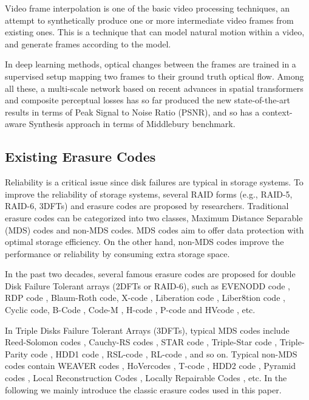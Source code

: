\documentclass[sigconf]{acmart}
\begin{document}
Video frame interpolation is one of the basic video processing techniques, an attempt to synthetically produce one or more intermediate video frames from existing ones. This is a technique that can model natural motion within a video, and generate frames according to the model.

In deep learning methods, optical changes between the frames are trained in a supervised setup mapping two frames to their ground truth optical flow. Among all these, a multi-scale network\cite{van2017frame} based on recent advances in spatial transformers and composite perceptual losses has so far produced the new state-of-the-art results in terms of Peak Signal to Noise Ratio (PSNR), and so has a context-aware Synthesis approach\cite{niklaus2018context} in terms of Middlebury benchmark.

\subsection{Existing Erasure Codes}\label{existEC}

Reliability is a critical issue since disk failures are typical in storage systems. To improve the reliability of storage systems, several RAID forms (e.g., RAID-5, RAID-6, 3DFTs) and erasure codes are proposed by researchers.  Traditional erasure codes can be categorized into two classes, Maximum Distance Separable (MDS) codes and non-MDS codes. MDS codes aim to offer data protection with optimal storage efficiency. On the other hand, non-MDS codes improve the performance or reliability by consuming extra storage space.

In the past two decades, several famous erasure codes are proposed for double Disk Failure Tolerant arrays (2DFTs or RAID-6), such as EVENODD code \cite{EVENODD}, RDP code \cite{RDP}, Blaum-Roth code\cite{BlaumRoth}, X-code \cite{XCode}, Liberation code \cite{Liberation}, Liber8tion code \cite{Liber8tion}, Cyclic \cite {Cyclic} code, B-Code \cite{BCode}, Code-M \cite{Code-M}, H-code \cite{hcode}, P-code \cite{PCode} and HVcode \cite{HVCode}, etc.

In Triple Disks Failure Tolerant Arrays (3DFTs), typical MDS codes include Reed-Solomon codes \cite{RS}, Cauchy-RS codes \cite{CRS}, STAR code \cite{STAR}, Triple-Star code \cite{TripleStar}, Triple-Parity code \cite{TPtech}, HDD1 code \cite{HDD}, RSL-code \cite{RSL}, RL-code \cite{RL}, and so on. Typical non-MDS codes contain WEAVER codes \cite{WEAVER}, HoVercodes \cite{HoVer}, T-code \cite{TCode}, HDD2 code \cite{HDD}, Pyramid codes \cite{Pyramid}, Local Reconstruction Codes \cite{LRC}, Locally Repairable Codes \cite{XORing}, etc.
In the following we mainly introduce the classic erasure codes used in this paper.
\end{document}
